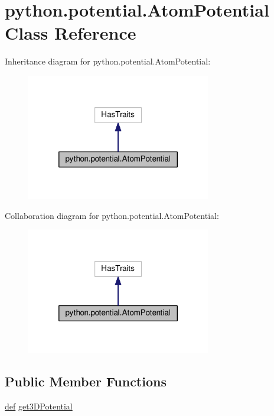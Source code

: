 \hypertarget{classpython_1_1potential_1_1_atom_potential}{\section{python.\-potential.\-Atom\-Potential Class Reference}
\label{classpython_1_1potential_1_1_atom_potential}
}


Inheritance diagram for python.\-potential.\-Atom\-Potential\-:
\nopagebreak
\begin{figure}[H]
\begin{center}
\leavevmode
\includegraphics[width=228pt]{classpython_1_1potential_1_1_atom_potential__inherit__graph}
\end{center}
\end{figure}


Collaboration diagram for python.\-potential.\-Atom\-Potential\-:
\nopagebreak
\begin{figure}[H]
\begin{center}
\leavevmode
\includegraphics[width=228pt]{classpython_1_1potential_1_1_atom_potential__coll__graph}
\end{center}
\end{figure}
\subsection*{Public Member Functions}
\begin{DoxyCompactItemize}
\item 
\hyperlink{sim_image_from_wave_8m_a72b6b8e83430abf007f20aeae4dc2f74}{def} \hyperlink{classpython_1_1potential_1_1_atom_potential_afd093e9846895011da5d27880e9f66c6}{get3\-D\-Potential}
\end{DoxyCompactItemize}


